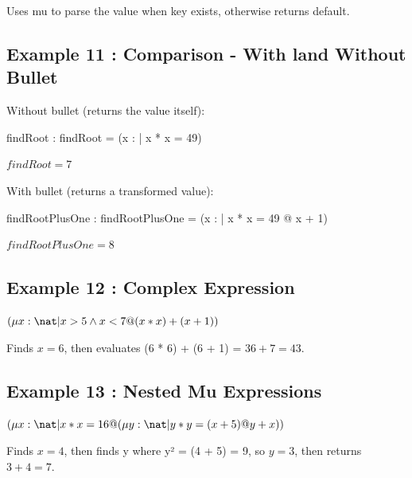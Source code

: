 \documentclass[a4paper,10pt,fleqn]{article}
\begin{document}
\noindent Uses mu to parse the value when key exists, otherwise returns default.

\bigskip

\subsection*{Example 11 : Comparison - With land Without Bullet}

\noindent Without bullet (returns the value itself):

\bigskip

\begin{axdef}
findRoot : \nat
\where
findRoot = (\mu x : \nat | x * x = 49)
\end{axdef}

\noindent $findRoot = 7$

\bigskip

\noindent With bullet (returns a transformed value):

\bigskip

\begin{axdef}
findRootPlusOne : \nat
\where
findRootPlusOne = (\mu x : \nat | x * x = 49 @ x + 1)
\end{axdef}

\noindent $findRootPlusOne = 8$

\bigskip

\subsection*{Example 12 : Complex Expression}

\noindent
$(\mu x : \nat | x > 5 \land x < 7 @ (x * x) + (x + 1))$


\noindent Finds $x = 6$, then evaluates (6 * 6) + (6 + 1) = $36 + 7 = 43$.

\bigskip

\subsection*{Example 13 : Nested Mu Expressions}

\noindent
$(\mu x : \nat | x * x = 16 @ (\mu y : \nat | y * y = (x + 5) @ y + x))$


\noindent Finds $x = 4$, then finds y where y² = (4 + 5) = 9, so $y = 3$, then returns $3 + 4 = 7$.
\end{document}
